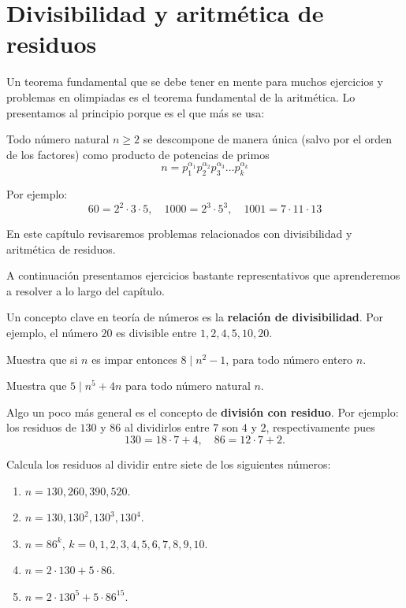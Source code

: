 \chapter{Divisibilidad y aritmética de residuos}
\label{cap:divisibilidad}

Un teorema fundamental que se debe tener en mente para muchos ejercicios y problemas en olimpiadas es el teorema fundamental de la aritmética. Lo presentamos al principio porque es el que más se usa:

\begin{teorema}
Todo número natural $n\geq 2$ se descompone de manera única (salvo por el orden de los factores) como producto de potencias de primos \[n=p_1^{\alpha_1}p_2^{\alpha_2}p_3^{\alpha_3}\dots p_k^{\alpha_k}\]
\end{teorema}
Por ejemplo: $$60=2^2\cdot 3\cdot 5,\quad  1000=2^3\cdot 5^3,\quad 1001=7\cdot 11 \cdot  13$$

En este capítulo revisaremos problemas relacionados con divisibilidad y aritmética de residuos.

A continuación presentamos ejercicios bastante representativos que aprenderemos a resolver a lo largo del capítulo.

Un concepto clave en teoría de números es la \textbf{relación de divisibilidad}. Por ejemplo, el número
$20$ es divisible entre $1, 2, 4, 5, 10, 20$.

\begin{ejercicio}
Muestra que si $n$ es impar entonces $8\mid n^2-1$, para todo número entero $n$.
\end{ejercicio}

\begin{ejercicio}
Muestra que $5\mid n^5+4n$ para todo número natural $n$.
\end{ejercicio}

Algo un poco más general es el concepto de \textbf{división con residuo}. Por ejemplo: los residuos de $130$ y $86$ al dividirlos entre $7$ son $4$ y $2$, respectivamente pues \[130=18\cdot 7+4,\quad 86=12\cdot 7+2.\]

\begin{ejercicio}
Calcula los residuos al dividir entre siete de los siguientes números: 
 \begin{enumerate}
     \item $n=130, 260, 390, 520$.
     \item $n=130, 130^2, 130^3, 130^4$.
     \item $n=86^k$, $k=0,1,2,3,4,5,6,7,8,9,10$.
     \item $n=2\cdot130+5\cdot86$.
     \item $n=2\cdot130^5+5\cdot86^{15}$.
 \end{enumerate}
\end{ejercicio}

